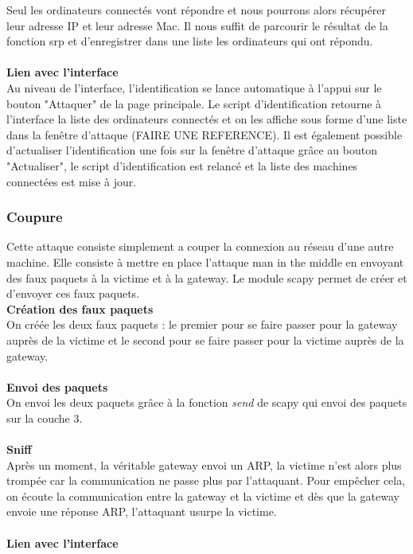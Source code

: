 \documentclass[11pt]{article}
\begin{document}
Seul les ordinateurs connectés vont répondre et nous pourrons alors récupérer leur adresse IP et leur adresse Mac. Il nous suffit de parcourir le résultat de la fonction srp et d'enregistrer dans une liste les ordinateurs qui ont répondu.~\\
~\\
\textbf{Lien avec l'interface}~\\

Au niveau de l'interface, l'identification se lance automatique à l'appui sur le bouton "Attaquer" de la page principale. Le script d'identification retourne à l'interface la liste des ordinateurs connectés et on les affiche sous forme d'une liste dans la fenêtre d'attaque (FAIRE UNE REFERENCE). Il est également possible d'actualiser l'identification une fois sur la fenêtre d'attaque grâce au bouton "Actualiser", le script d'identification est relancé et la liste des machines connectées est mise à jour.



\subsubsection{Coupure}
Cette attaque consiste simplement a couper la connexion au réseau d'une autre machine. Elle consiste à mettre en place l'attaque man in the middle en envoyant des faux paquets à la victime et à la gateway. Le module scapy permet de créer et d'envoyer ces faux paquets.~\\

\textbf{Création des faux paquets}~\\

On créée les deux faux paquets : le premier pour se faire passer pour la gateway auprès de la victime et le second pour se faire passer pour la victime auprès de la gateway.~\\
~\\
\textbf{Envoi des paquets}~\\

On envoi les deux paquets grâce à la fonction \textit{send} de scapy qui envoi des paquets sur la couche 3.~\\
~\\
\textbf{Sniff}~\\

Après un moment, la véritable gateway envoi un ARP, la victime n'est alors plus trompée car la communication ne passe plus par l'attaquant. Pour empêcher cela, on écoute la communication entre la gateway et la victime et dès que la gateway envoie une réponse ARP, l'attaquant usurpe la victime.~\\
~\\
\textbf{Lien avec l'interface}~\\
\end{document}
